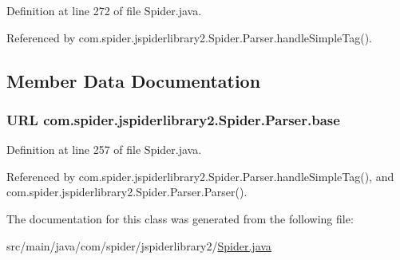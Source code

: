 \-Definition at line 272 of file \-Spider.\-java.



\-Referenced by com.\-spider.\-jspiderlibrary2.\-Spider.\-Parser.\-handle\-Simple\-Tag().



\subsection{\-Member \-Data \-Documentation}
\hypertarget{classcom_1_1spider_1_1jspiderlibrary2_1_1_spider_1_1_parser_aaac5fcd0aa0bdd67e4c6842d2657231d}{
\subsubsection[{base}]{\setlength{\rightskip}{0pt plus 5cm}\-U\-R\-L {\bf com.\-spider.\-jspiderlibrary2.\-Spider.\-Parser.\-base}}}\label{classcom_1_1spider_1_1jspiderlibrary2_1_1_spider_1_1_parser_aaac5fcd0aa0bdd67e4c6842d2657231d}


\-Definition at line 257 of file \-Spider.\-java.



\-Referenced by com.\-spider.\-jspiderlibrary2.\-Spider.\-Parser.\-handle\-Simple\-Tag(), and com.\-spider.\-jspiderlibrary2.\-Spider.\-Parser.\-Parser().



\-The documentation for this class was generated from the following file\-:\begin{DoxyCompactItemize}
\item 
src/main/java/com/spider/jspiderlibrary2/\hyperlink{_spider_8java}{\-Spider.\-java}\end{DoxyCompactItemize}
